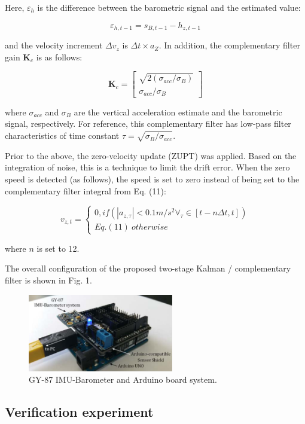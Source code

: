 \documentclass[10pt,journal,compsoc]{IEEEtran}
\begin{document}
Here, $\varepsilon_h$ is the difference between the barometric signal and the estimated value:

\[\varepsilon_{h,t-1} = s_{B,t-1} - h_{z,t-1}\tag{12}\]

\noindent
and the velocity increment $\Delta v_z$ is $\Delta t \times a_Z$. In addition, the complementary filter gain 
$\bm{K}_c$ is as follows:

\[\bm{K}_c = \begin{bmatrix}  \sqrt{2 (\sigma_{acc}/\sigma_B)} \\ \sigma_{acc}/\sigma_B \end{bmatrix} \tag{13}\]

\noindent where $\sigma_{acc}$ and $\sigma_B$ are the vertical acceleration estimate and the barometric signal,
respectively.   For reference, this complementary filter has low-pass filter
characteristics of time constant $\tau = \sqrt{\sigma_B/\sigma_{acc}}$.


Prior to the above, the zero-velocity update (ZUPT) was applied.  Based
on the integration of noise, this is a technique to limit the drift error. When the
zero speed is detected (as follows), the speed is set to zero instead of being set to
the complementary filter integral from Eq. (11):

\[v_{z,t} = \begin{cases} 0, if (|a_{z,\tau}|<0.1m/s^2 \forall_\tau\in[t-n\Delta t, t]) \\ Eq. (11)~otherwise \end{cases} \tag{14}\]

\noindent where $n$ is set to 12.

The overall configuration of the proposed two-stage Kalman / complementary filter is shown in Fig. 1.

\begin{figure}[!t]
\centering
\includegraphics[width=2.5in]{fig2}
\caption{GY-87 IMU-Barometer and Arduino board system.}
\label{fig2}
\end{figure}


\subsection{Verification experiment}
\end{document}
